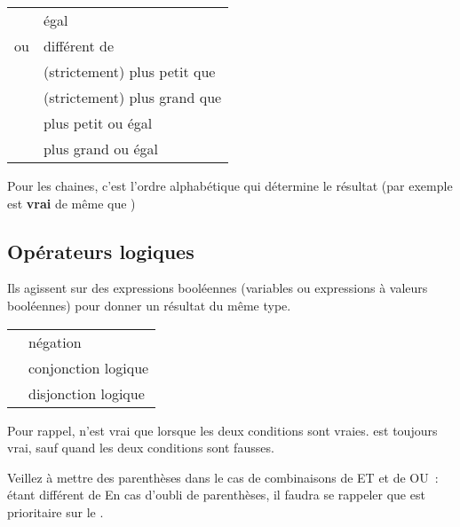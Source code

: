 			\begin{center}
			\begin{tabular}{m{2cm}|m{11cm}}
			\raggedleft  \pseudocode{=} & égal\\
			\raggedleft  \pseudocode{{\textless}{\textgreater}}
				ou \pseudocode{${\neq}$} &  différent de\\
			\raggedleft  \pseudocode{\textless} & (strictement) plus petit que\\
			\raggedleft  \pseudocode{\textgreater} & (strictement) plus grand que\\
			\raggedleft  \pseudocode{${\leq}$} & plus petit ou égal\\
			\raggedleft  \pseudocode{${\geq}$} & plus grand ou égal\\
			\end{tabular}
			\end{center}
	
			Pour les chaines, 
			c’est l’ordre alphabétique qui détermine le résultat 
			(par exemple
			 est \textbf{vrai} 
			de même que
			)
	
		\subsection{Opérateurs logiques}
	
			Ils agissent sur des expressions booléennes (variables ou expressions à
			valeurs booléennes) pour donner un résultat du même type.
	
			\begin{center}
			\begin{tabular}{m{1cm}|m{12cm}}
			\raggedleft \pseudocode{NON} & négation\\
			\raggedleft \pseudocode{ET} & conjonction logique\\
			\raggedleft \pseudocode{OU} & disjonction logique\\
			\end{tabular}
			\end{center}
	
			Pour rappel,  n’est vrai que lorsque
			les deux conditions sont vraies.  est
			toujours vrai, sauf quand les deux conditions sont fausses.
	
			Veillez à mettre des parenthèses dans le cas de combinaisons de ET et de
			OU~:  étant différent de
			 En cas
			d’oubli de parenthèses, il faudra se rappeler que
			 est prioritaire sur le .
			
